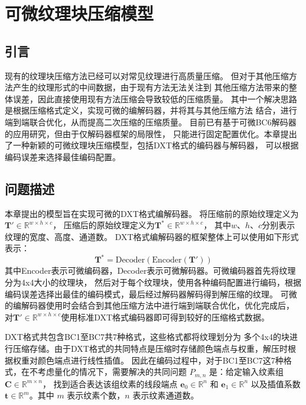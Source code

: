 
\chapter{可微纹理块压缩模型}

\section{引言}

现有的纹理块压缩方法已经可以对常见纹理进行高质量压缩。
但对于其他压缩方法产生的纹理形式的中间数据，由于现有方法无法关注到
其他压缩方法带来的整体误差，因此直接使用现有方法压缩会导致较低的压缩质量。
其中一个解决思路是根据压缩格式定义，实现可微的编解码器，并将其与其他压缩方法
结合，进行端到端联合优化，从而提高二次压缩的压缩质量。
目前已有基于可微BC6解码器的应用研究，但由于仅解码器框架的局限性，
只能进行固定配置优化。本章提出了一种新颖的可微纹理块压缩模型，包括DXT格式的编码器与解码器，
可以根据编码误差来选择最佳编码配置。

\section{问题描述}
\label{问题描述}

本章提出的模型旨在实现可微的DXT格式编解码器。
将压缩前的原始纹理定义为$\mathbf{T}'\in \mathbb{R}^{w\times h\times c}$，
压缩后的原始纹理定义为$\mathbf{T}^*\in \mathbb{R}^{w\times h\times c}$，
其中$w$、$h$、$c$分别表示纹理的宽度、高度、通道数。
DXT格式编解码器的框架整体上可以使用如下形式表示：
\begin{equation}
    \mathbf{T}^*=\text{Decoder}(\text{Encoder}(\mathbf{T}'))
\end{equation}
其中Encoder表示可微编码器，Decoder表示可微解码器。可微编码器首先将纹理分为4x4大小的纹理块，
然后对于每个纹理块，使用各种编码配置进行编码，根据编码误差选择出最佳的编码模式，最后经过解码器解码得到解压缩的纹理。
可微的编解码器使用时会结合到其他压缩方法中进行端到端联合优化，优化完成后，
对$\mathbf{T}'\in \mathbb{R}^{w\times h\times c}$使用标准DXT格式编码器即可得到较好的压缩格式数据。

DXT格式共包含BC1至BC7共7种格式，这些格式都将纹理划分为
多个4x4的块进行压缩存储。由于DXT格式的共同特点是压缩时存储颜色端点与权重，解压时根据权重对颜色端点进行线性插值。
因此在编码过程中，对于BC1至BC7这7种格式，在不考虑量化的情况下，需要解决的共同问题 $P_{m,n}$ 是：给定输入纹素组 $\mathbf{C}\in\mathbb{R}^{m\times n}$，
找到适合表达该组纹素的线段端点 $\mathbf{e}_0\in\mathbb{R}^n$ 和 $\mathbf{e}_1\in\mathbb{R}^n$ 
以及插值系数 $\mathbf{t}\in\mathbb{R}^m$。其中 $m$ 表示纹素个数，$n$ 表示纹素通道数。

